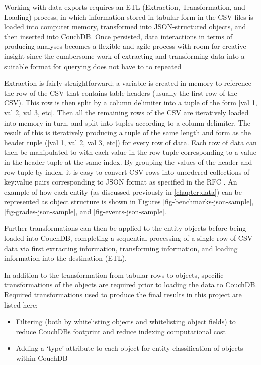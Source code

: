 Working with data exports requires an ETL (Extraction, Transformation, and Loading) process, in which information stored in tabular form in the CSV files is loaded into computer memory, transformed into JSON-structured objects, and then inserted into CouchDB. Once persisted, data interactions in terms of producing analyses becomes a flexible and agile process with room for creative insight since the cumbersome work of extracting and transforming data into a suitable format for querying does not have to to repeated

Extraction is fairly straightforward; a variable is created in memory to reference the row of the CSV that contains table headers (usually the first row of the CSV). This row is then split by a column delimiter into a tuple of the form [val 1, val 2, val 3, etc]. Then all the remaining rows of the CSV are iteratively loaded into memory in turn, and split into tuples according to a column delimiter. The result of this is iteratively producing a tuple of the same length and form as the header tuple ([val 1, val 2, val 3, etc]) for every row of data. Each row of data can then be manipulated to with each value in the row tuple corresponding to a value in the header tuple at the same index. By grouping the values of the header and row tuple by index, it is easy to convert CSV rows into unordered collections of key:value pairs corresponding to JSON format as specified in the RFC \cite{rfc7159}. An example of how each entity (as discussed previously in \autoref{chapter:data}) can be represented as object structure is shown in Figures \ref{fig-benchmarks-json-sample}, \ref{fig-grades-json-sample}, and \ref{fig-events-json-sample}.





Further transformations can then be applied to the entity-objects before being loaded into CouchDB, completing a sequential processing of a single row of CSV data via first extracting information, transforming information, and loading information into the destination (ETL).

In addition to the transformation from tabular rows to objects, specific transformations of the objects are required prior to loading the data to CouchDB. Required transformations used to produce the final results in this project are listed here:

\begin{itemize}
  \item Filtering (both by whitelisting objects and whitelisting object fields) to reduce CouchDBs footprint and reduce indexing computational cost
  \item Adding a `type' attribute to each object for entity classification of objects within CouchDB
\end{itemize}

